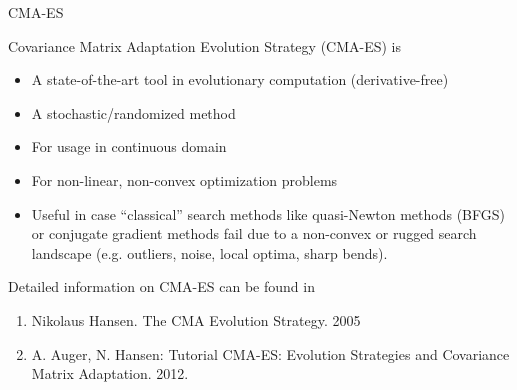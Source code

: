 \documentclass[11pt,compress,t,notes=noshow, xcolor=table]{beamer}
\begin{document}
\begin{vbframe}{CMA-ES}

Covariance Matrix Adaptation Evolution Strategy (CMA-ES) is

\begin{itemize}
\item A state-of-the-art tool in evolutionary computation (derivative-free)
\item A stochastic/randomized method
\item For usage in continuous domain
\item For non-linear, non-convex optimization problems
\item Useful in case \enquote{classical} search methods like quasi-Newton methods (BFGS) or conjugate gradient methods fail due to a non-convex or rugged search landscape (e.g. outliers, noise, local optima, sharp bends).
\end{itemize}

Detailed information on CMA-ES can be found in

\begin{enumerate}
\item Nikolaus Hansen. The CMA Evolution Strategy. 2005
\item A. Auger, N. Hansen: Tutorial CMA-ES: Evolution Strategies and Covariance Matrix Adaptation. 2012.
\end{enumerate}

\end{vbframe}
\end{document}
